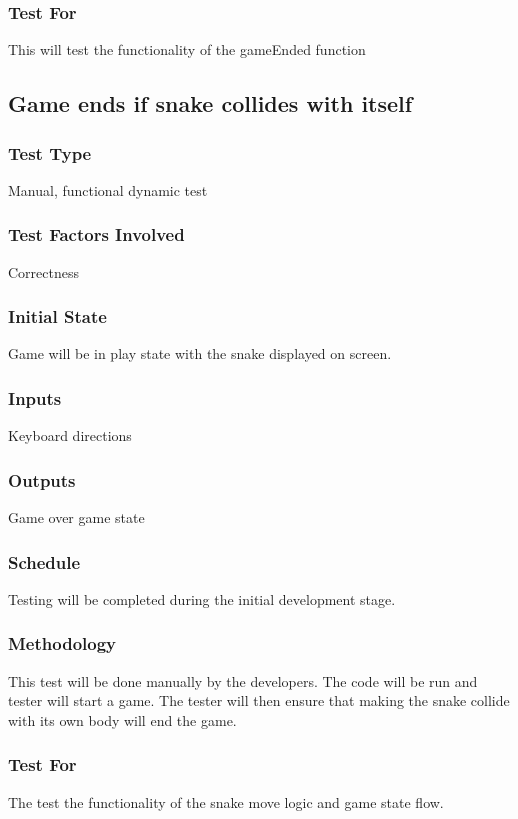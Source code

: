 \documentclass[12pt]{article}
\begin{document}
\subsubsection*{Test For}
This will test the functionality of the gameEnded function \newline

\noindent
\subsection{Game ends if snake collides with itself}
\subsubsection*{Test Type}
Manual, functional dynamic test
\subsubsection*{Test Factors Involved}
Correctness
\subsubsection*{Initial State}
Game will be in play state with the snake displayed on screen.
\subsubsection*{Inputs}
Keyboard directions
\subsubsection*{Outputs}
Game over game state
\subsubsection*{Schedule}
Testing will be completed during the initial development stage.
\subsubsection*{Methodology}
This test will be done manually by the developers. The code will be run and tester will start a game. The tester will then ensure that making the snake collide with its own body will end the game.
\subsubsection*{Test For}
The test the functionality of the snake move logic and game state flow. \newline
\end{document}
